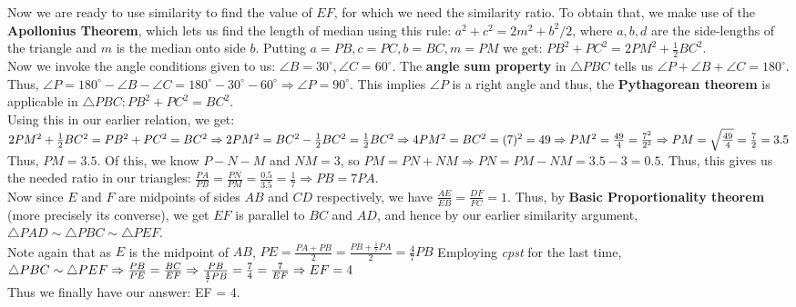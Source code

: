 Now we are ready to use similarity to find the value of \(EF\), for which we need the similarity ratio. To obtain that, we make use of the \textbf{Apollonius Theorem}, which lets us find the length of median using this rule: \(a^2 + c^2 = 2m^2 + b^2/2\), where \(a,b,d\) are the side-lengths of the triangle and \(m\) is the median onto side \(b\). Putting \(a=PB, c=PC, b=BC, m=PM\) we get: \(PB^2 + PC^2 = 2PM^2 + \frac{1}{2}BC^2\).
\\
Now we invoke the angle conditions given to us: \(\angle B = 30^\circ, \angle C = 60^\circ\). The \textbf{angle sum property} in \(\triangle PBC\) tells us \(\angle P + \angle B + \angle C = 180^\circ\). Thus, \(\angle P = 180^\circ - \angle B - \angle C = 180^\circ - 30^\circ - 60^\circ \Rightarrow \angle P = 90^\circ\). This implies \(\angle P\) is a right angle and thus, the \textbf{Pythagorean theorem} is applicable in \(\triangle PBC: PB^2 + PC^2 = BC^2\).
\\
Using this in our earlier relation, we get: \(2PM^2 + \frac{1}{2}BC^2 = PB^2 + PC^2 = BC^2 \\ \Rightarrow 2PM^2 = BC^2 - \frac{1}{2}BC^2 = \frac{1}{2}BC^2 \\ \Rightarrow 4PM^2 = BC^2 = (7)^2 = 49\\ \Rightarrow PM^2 = \frac{49}{4} =\frac{7^2}{2^2} \\ \Rightarrow PM = \sqrt{\frac{49}{4}} = \frac{7}{2} = 3.5\)
\\
Thus, \(PM=3.5\). Of this, we know \(P-N-M\) and \(NM = 3\), so \(PM = PN + NM \Rightarrow PN = PM - NM = 3.5 - 3 = 0.5\). Thus, this gives us the needed ratio in our triangles: \(\frac{PA}{PB} = \frac{PN}{PM}=\frac{0.5}{3.5} = \frac{1}{7} \Rightarrow PB = 7PA\).
\\
Now since \(E\) and \(F\) are midpoints of sides \(AB\) and \(CD\) respectively, we have \(\frac{AE}{EB} = \frac{DF}{FC} = 1\). Thus, by \textbf{Basic Proportionality theorem} (more precisely its converse), we get \(EF\) is parallel to \(BC\) and \(AD\), and hence by our earlier similarity argument, \(\triangle PAD \sim \triangle PBC \sim \triangle PEF\).
\\
Note again that as \(E\) is the midpoint of \(AB\), \(PE = \frac{PA+PB}{2} = \frac{PB+\frac{1}{7}PA}{2} = \frac{4}{7}PB\) Employing \textit{cpst} for the last time, \(\triangle PBC \sim \triangle PEF \Rightarrow \frac{PB}{PE} = \frac{BC}{EF} \Rightarrow \frac{PB}{\frac{4}{7}PB} = \frac{7}{4} = \frac{7}{EF} \\ \Rightarrow EF = 4\) 
\\ 
Thus we finally have our answer: EF = 4.
